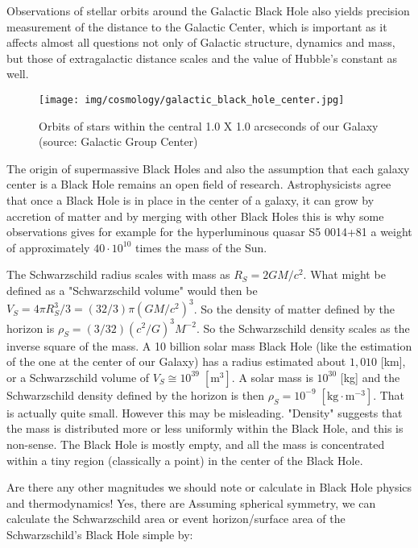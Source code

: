 	Observations of stellar orbits around the Galactic Black Hole also yields precision measurement of the distance to the Galactic Center, which is important as it affects almost all questions not only of Galactic structure, dynamics and mass, but those of extragalactic distance scales and the value of Hubble's constant as well.
	\begin{figure}[H]
		\centering
		\texttt{[image: img/cosmology/galactic\_black\_hole\_center.jpg]}	
		\caption[Orbits of stars within the central 1.0 X 1.0 arcseconds of our Galaxy]{Orbits of stars within the central 1.0 X 1.0 arcseconds of our Galaxy (source: Galactic Group Center)}
	\end{figure}
	The origin of supermassive Black Holes and also the assumption that each galaxy center is a Black Hole remains an open field of research. Astrophysicists agree that once a Black Hole is in place in the center of a galaxy, it can grow by accretion of matter and by merging with other Black Holes this is why some observations gives for example for the hyperluminous quasar S5 0014+81 a weight of approximately $40\cdot 10^10$ times the mass of the Sun.
	
	\begin{tcolorbox}[title=Remark,colframe=black,arc=10pt]
	The Schwarzschild radius scales with mass as $R_S = 2GM/c^2$. What might be defined as a "Schwarzschild volume" would then be $V_S = 4\pi R_S^3/3 = (32/3)\pi(GM/c^2)^3$. So the density of matter defined by the horizon is $\rho_S = (3/32)(c^2/G)^3M^{-2}$. So the Schwarzschild density scales as the inverse square of the mass. A 10 billion solar mass Black Hole (like the estimation of the one at the center of our Galaxy) has a radius estimated about $1,010$ [km], or a Schwarzschild volume of $V_S \cong 10^{39}\;[\text{m}^3]$. A solar mass is $10^{30}$ [kg] and the Schwarzschild  density defined by the horizon is then $\rho_S = 10^{-9}\;[\text{kg}\cdot\text{m}^{-3}]$. That is actually quite small. However this may be misleading. "Density" suggests that the mass is distributed more or less uniformly within the Black Hole, and this is non-sense. The Black Hole is mostly empty, and all the mass is concentrated within a tiny region (classically a point) in the center of the Black Hole.
	\end{tcolorbox}
	
	Are there any other magnitudes we should note or calculate in Black Hole physics and thermodynamics! Yes, there are Assuming spherical symmetry, we can calculate the Schwarzschild area or event horizon/surface area of the Schwarzschild's Black Hole simple by:
   
